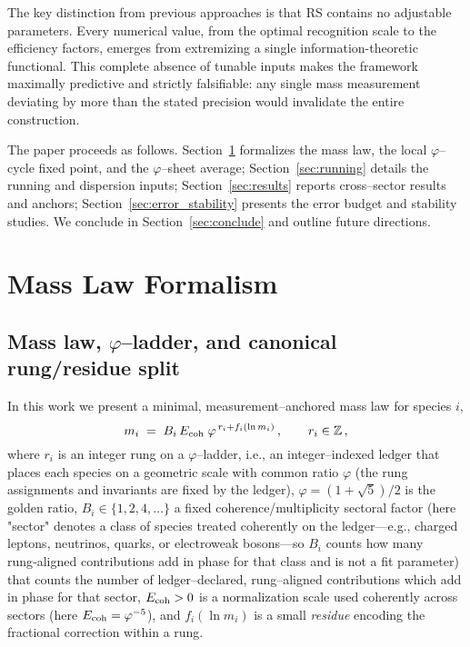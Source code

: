 \documentclass[%
  amsmath,amssymb,
  aps,
 prb,
 floatfix, showkeys
 ]{revtex4-2}
\begin{document}
 The key distinction from previous approaches is that RS contains no adjustable
 parameters. Every numerical value, from the optimal recognition scale
 to the efficiency factors, emerges from extremizing a single information-theoretic
 functional. This complete absence of tunable inputs makes the framework maximally
 predictive and strictly falsifiable: any single mass measurement deviating by more
 than the stated precision would invalidate the entire construction.
 
 The paper proceeds as follows. Section~\ref{sec:formalism} formalizes the mass law, the local $\varphi$–cycle fixed point, and the $\varphi$–sheet average; Section~\ref{sec:running} details the running and dispersion inputs; Section~\ref{sec:results} reports cross–sector results and anchors; Section~\ref{sec:error_stability} presents the error budget and stability studies. We conclude in Section~\ref{sec:conclude} and outline future directions.
 
 \section{Mass Law Formalism}
 \label{sec:formalism}
 \vspace{-1.0cm}
 \subsection{Mass law, $\varphi$--ladder, and canonical rung/residue split}
 \label{subsec:mass-law}
 
 In this work we present a minimal, measurement–anchored mass law for 
  species $i$, 
  \begin{equation}
   m_i \;=\; B_i\,E_{\rm coh}\;\varphi^{\,r_i+f_i(\ln m_i)}\,,\qquad r_i\in\mathbb{Z}\,,
   \label{eq:mass_law_intro}
 \end{equation}
 where $r_i$ is an integer rung on a $\varphi$–ladder, i.e., an integer–indexed ledger that places each species on a geometric scale with common ratio $\varphi$ (the rung assignments and invariants are fixed by the ledger),
 $\varphi = (1+\sqrt{5})/2$ is the golden ratio, 
 $B_i\in\{1,2,4,\dots\}$ a fixed coherence/multiplicity sectoral factor (here "sector" denotes a class of species treated coherently on the ledger—e.g., charged leptons, neutrinos, quarks, or electroweak bosons—so $B_i$ counts how many rung‑aligned contributions add in phase for that class and is not a fit parameter)
 that counts the number of ledger–declared, rung–aligned contributions which add in
 phase for that sector,
  $E_{\rm coh}>0$ is a normalization scale used coherently across sectors (here $E_{\rm coh}=\varphi^{-5}$),
 and
  $f_i(\ln m_i)$ is a small  \emph{residue} encoding the fractional correction within a rung.
 
\end{document}
